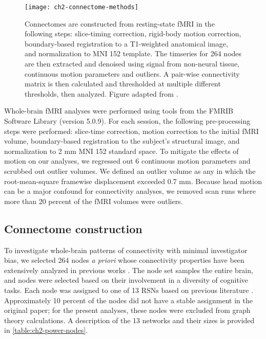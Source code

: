 \begin{figure}[t]
    \centering
    \texttt{[image: ch2-connectome-methods]}
    \caption[Schematic for connectome construction.]{Connectomes are constructed from resting-state fMRI in the following steps: slice-timing correction, rigid-body motion correction, boundary-based registration to a T1-weighted anatomical image, and normalization to MNI 152 template. The timseries for 264 nodes are then extracted and denoised using signal from non-neural tissue, continuous motion parameters and outliers. A pair-wise connectivity matrix is then calculated and thresholded at multiple different thresholds, then analyzed. Figure adapted from \citep{Yang2018}.}
    \label{fig:ch2-connectome-methods}
\end{figure}

Whole-brain fMRI analyses were performed using tools from the FMRIB Software Library (version 5.0.9). For each session, the following pre-processing steps were performed:  slice-time correction, motion correction to the initial fMRI volume, boundary-based registration to the subject's structural image, and normalization to 2 mm MNI 152 standard space. To mitigate the effects of motion on our analyses, we regressed out 6 continuous motion parameters and scrubbed out outlier volumes. We defined an outlier volume as any in which the root-mean-square framewise displacement exceeded 0.7 mm. Because head motion can be a major confound for connectivity analyses, we removed scan runs where more than 20 percent of the fMRI volumes were outliers.

\subsection{Connectome construction}

To investigate whole-brain patterns of connectivity with minimal investigator bias, we selected 264 nodes \textit{a priori} whose connectivity properties have been extensively analyzed in previous works \citep{Power2011}. The node set samples the entire brain, and nodes were selected based on their involvement in a diversity of cognitive tasks. Each node was assigned to one of 13 RSNs based on previous literature \citep{Power2013}. Approximately 10 percent of the nodes did not have a stable assignment in the original paper; for the present analyses, these nodes were excluded from graph theory calculations. A description of the 13 networks and their sizes is provided in \ref{table:ch2-power-nodes}. 


